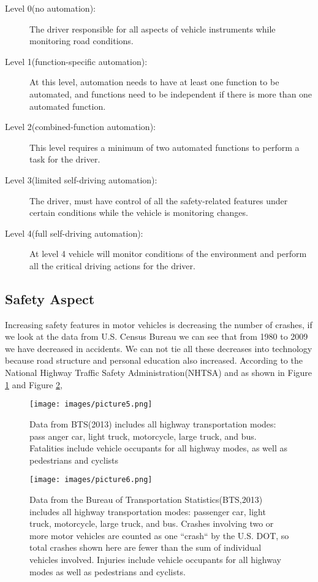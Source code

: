 \documentclass[sigconf]{acmart}
\begin{document}
\begin{description}
    \item[Level 0(no automation):] The driver responsible for all aspects of vehicle instruments while monitoring road con\-di\-ti\-ons\cite{hamzah}.
    \item[Level 1(function-specific automation):] At this level, automation needs to have at least one function to be automated, and functions need to be independent if there is more than one automated function\cite{hamzah}.
    \item[Level 2(combined-function automation):] This level re\-qu\-ir\-es a minimum of two automated functions to perform a task for the driver\cite{hamzah}.
    \item[Level 3(limited self-driving automation):] The driver, mu\-st have control of all the safety-related features under certain conditions while the vehicle is monitoring changes\cite{hamzah}.
    \item[Level 4(full self-driving automation):]At level 4 vehicle will monitor conditions of the environment and perform all the critical driving actions for the driver\cite{hamzah}.
\end{description}

\subsection{Safety Aspect}
Increasing safety features in motor vehicles is decreasing the number of crashes, if we look at the data from U.S. Census Bureau we can see that from 1980 to 2009 we have decreased in accidents. We can not tie all these decreases into technology because road structure and personal education also increased. According to the National Highway Traffic Safety Administration(NHTSA) and as shown in Figure \ref{fig:NHTSAaccidentreport} and Figure \ref{fig:NHTSAaccidentreport2}, 
 
 \begin{figure}[!ht]
  \centering
      \texttt{[image: images/picture5.png]}
  \caption{Data from BTS(2013) includes all highway transportation modes: pass anger car, light truck, motorcycle, large truck, and bus. Fatalities include vehicle occupants for all highway modes, as well as pedestrians and cyclists}\label{fig:NHTSAaccidentreport}
\end{figure}

 \begin{figure}[!ht]
  \centering
      \texttt{[image: images/picture6.png]}
  \caption{Data from the Bureau of Transportation Statistics(BTS,2013) includes all highway transportation modes: passenger car, light truck, motorcycle, large truck, and bus. Crashes involving two or more motor vehicles are counted as one ``crash`` by the U.S. DOT, so total crashes shown  here are fewer than the sum of individual vehicles involved. Injuries include vehicle occupants for all highway modes as well as pedestrians and cyclists.}\label{fig:NHTSAaccidentreport2}
\end{figure}
\end{document}
